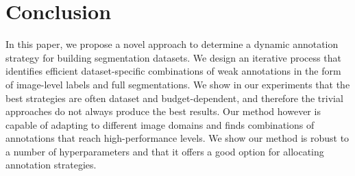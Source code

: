 \section{Conclusion}
\label{sec:conclusion}
In this paper, we propose a novel approach to determine a dynamic annotation strategy for building segmentation datasets. We design an iterative process that identifies efficient dataset-specific combinations of weak annotations in the form of image-level labels and full segmentations. We show in our experiments that the best strategies are often dataset and budget-dependent, and therefore the trivial approaches do not always produce the best results. Our method however is capable of adapting to different image domains and finds combinations of annotations that reach high-performance levels. We show our method is robust to a number of hyperparameters and that it offers a good option for allocating annotation strategies. 
